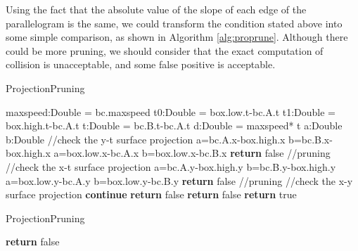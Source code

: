 \documentclass[sigplan]{acmart}
\begin{document}
Using the fact that the absolute value of the slope of each edge of the parallelogram is the same, we could transform the condition stated above into some simple comparison, as shown in Algorithm \ref{alg:proprune}. Although there could be more pruning, we should consider that the exact computation of collision is unacceptable, and some false positive is acceptable.
\begin{algorithm}
\caption{ProjectionPruning} \label{alg:proprune}
\begin{algorithmic}[ht]
    \State maxspeed:Double = bc.maxspeed
    \State t0:Double = box.low.t-bc.A.t
    \State t1:Double = box.high.t-bc.A.t
    \State t:Double = bc.B.t-bc.A.t
    \State d:Double = maxspeed* t
    \State a:Double
    \State b:Double
    \State //check the y-t surface projection
        \State a=bc.A.x-box.high.x
        \State b=bc.B.x-box.high.x
    \Else
        \State a=box.low.x-bc.A.x
        \State b=box.low.x-bc.B.x
    \EndIf
        \State \textbf{return} false //pruning
    \EndIf
    \State //check the x-t surface projection
        \State a=bc.A.y-box.high.y
        \State b=bc.B.y-box.high.y
    \Else
        \State a=box.low.y-bc.A.y
        \State b=box.low.y-bc.B.y
    \EndIf
        \State \textbf{return} false //pruning
    \EndIf
    \State //check the x-y surface projection
            \State \textbf{continue}
    \EndIf
            \State \textbf{return} false
        \EndIf
    \Else
            \State \textbf{return} false
        \EndIf
    \EndIf
    \State \textbf{return} true
\EndFunction
\end{algorithmic}
\end{algorithm}

\begin{algorithm}
\caption{ProjectionPruning} \label{alg:proprune}
\begin{algorithmic}[ht]
        \State \textbf{return} false
    \EndIf
\EndFunction
\end{algorithmic}
\end{algorithm}
\end{document}
